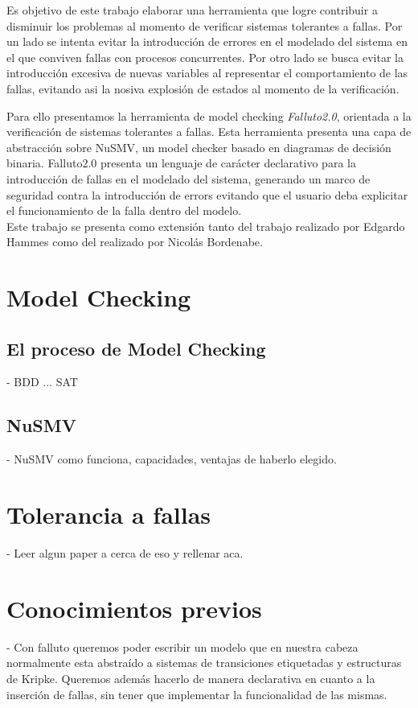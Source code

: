 \documentclass[titlepage, 12pt]{book}
\begin{document}
Es objetivo de este trabajo elaborar una herramienta que logre contribuir a disminuir los problemas al momento de verificar sistemas tolerantes a fallas. Por un lado se intenta evitar la introducci\'on de errores en el modelado del sistema en el que conviven fallas con procesos concurrentes. Por otro lado se busca evitar la introducci\'on excesiva de nuevas variables al representar el comportamiento de las fallas, evitando asi la nosiva explosi\'on de estados al momento de la verificaci\'on.

Para ello presentamos la herramienta de model checking \emph{Falluto2.0}, orientada a la verificaci\'on de sistemas tolerantes a fallas. Esta herramienta presenta una capa de abstracci\'on sobre NuSMV\cite{NuSMV}, un model checker basado en diagramas de decisi\'on binaria. Falluto2.0 presenta un lenguaje de car\'acter declarativo para la introducci\'on de fallas en el modelado del sistema, generando un marco de seguridad contra la introducci\'on de errors evitando que el usuario deba explicitar el funcionamiento de la falla dentro del modelo.\\ Este trabajo se presenta como extensi\'on tanto del trabajo realizado por Edgardo Hammes\cite{Falluto1} como del realizado por Nicol\'as Bordenabe\cite{Offbeat}.


\chapter{Model Checking}
		
		\section{El proceso de Model Checking}
				- BDD ... SAT\\
		\section{NuSMV}
			- NuSMV como funciona, capacidades, ventajas de haberlo elegido.


\chapter{Tolerancia a fallas}
			- Leer algun paper a cerca de eso y rellenar aca.

\chapter{Conocimientos previos}
			- Con falluto queremos poder escribir un modelo que en nuestra cabeza normalmente esta abstra\'ido a
			sistemas de transiciones etiquetadas y estructuras de Kripke. Queremos adem\'as hacerlo de manera declarativa en
			cuanto a la inserci\'on de fallas, sin tener que implementar la funcionalidad de las mismas.\\
\end{document}
